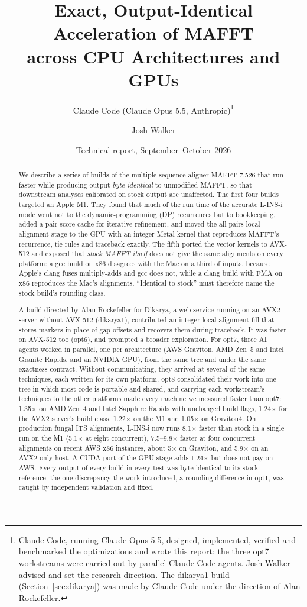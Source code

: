 \documentclass[11pt]{article}
\title{Exact, Output-Identical Acceleration of MAFFT\\across CPU Architectures and GPUs}
\author{Claude Code (Claude Opus 5.5, Anthropic)\thanks{Claude Code, running Claude Opus 5.5,
designed, implemented, verified and benchmarked the optimizations and wrote this report; the
three opt7 workstreams were carried out by parallel Claude Code agents. Josh Walker advised and
set the research direction. The dikarya1 build (Section~\ref{sec:dikarya}) was made by Claude
Code under the direction of Alan Rockefeller.} \and Josh Walker}
\date{Technical report, September--October 2026}
\begin{document}
\maketitle

\begin{abstract}
We describe a series of builds of the multiple sequence aligner MAFFT 7.526 that run faster
while producing output \emph{byte-identical} to unmodified MAFFT, so that downstream analyses
calibrated on stock output are unaffected. The first four builds targeted an Apple M1. They
found that much of the run time of the accurate L-INS-i mode went not to the
dynamic-programming (DP) recurrences but to bookkeeping, added a pair-score cache for
iterative refinement, and moved the all-pairs local-alignment stage to the GPU with an integer
Metal kernel that reproduces MAFFT's recurrence, tie rules and traceback exactly. The fifth
ported the vector kernels to AVX-512 and exposed that \emph{stock MAFFT itself} does not give
the same alignments on every platform: a gcc build on x86 disagrees with the Mac on a third of
inputs, because Apple's clang fuses multiply-adds and gcc does not, while a clang build with
FMA on x86 reproduces the Mac's alignments. ``Identical to stock'' must therefore name the
stock build's rounding class.

A build directed by Alan Rockefeller for Dikarya, a web service running on an AVX2 server
without AVX-512 (dikarya1), contributed an integer
local-alignment fill that stores markers in place of gap offsets and recovers them during
traceback. It was faster on AVX-512 too (opt6), and prompted a broader exploration. For opt7,
three AI agents worked in parallel, one per architecture (AWS Graviton, AMD Zen~5 and Intel
Granite Rapids, and an NVIDIA GPU), from the same tree and under the same exactness contract.
Without communicating, they arrived at several of the same techniques, each written for its own
platform. opt8 consolidated their work into one tree in which most code is portable and shared,
and carrying each workstream's techniques to the other platforms made every machine we measured
faster than opt7: 1.35$\times$ on AMD Zen~4 and Intel Sapphire Rapids with unchanged build
flags, 1.24$\times$ for the AVX2 server's build class, 1.22$\times$ on the M1 and 1.05$\times$ on
Graviton4. On production fungal ITS alignments, L-INS-i now runs 8.1$\times$ faster than stock in
a single run on the M1 (5.1$\times$ at eight concurrent), 7.5--9.8$\times$ faster at four concurrent alignments on recent AWS x86
instances, about 5$\times$ on Graviton, and 5.9$\times$ on an AVX2-only host. A CUDA port of the
GPU stage adds 1.24$\times$ but does not pay on AWS. Every output of every build in every test
was byte-identical to its stock reference; the one discrepancy the work introduced, a rounding
difference in opt1, was caught by independent validation and fixed.
\end{abstract}
\end{document}
